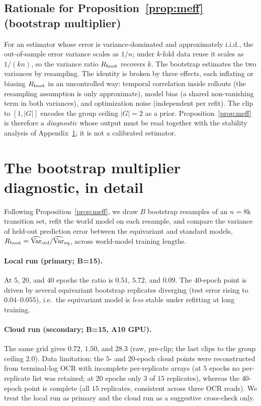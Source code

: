 \documentclass[preprint,12pt]{elsarticle}
\begin{document}
\subsection{Rationale for Proposition~\ref{prop:meff} (bootstrap multiplier)}
For an estimator whose error is variance-dominated and approximately i.i.d.,
the out-of-sample error variance scales as $1/n$; under $k$-fold data reuse
it scales as $1/(kn)$, so the variance ratio $R_{\rm boot}$ recovers $k$. The
bootstrap estimates the two variances by resampling. The identity is broken
by three effects, each inflating or biasing $R_{\rm boot}$ in an uncontrolled
way: temporal correlation inside rollouts (the resampling assumption is only
approximate), model bias (a shared non-vanishing term in both variances), and
optimization noise (independent per refit). The clip to $[1,|G|]$ encodes the
group ceiling $|G|=2$ as a prior. Proposition~\ref{prop:meff} is therefore a
\emph{diagnostic} whose output must be read together with the stability
analysis of Appendix~\ref{app:meff}; it is not a calibrated estimator.

\section{The bootstrap multiplier diagnostic, in detail}\label{app:meff}

Following Proposition~\ref{prop:meff}, we draw $B$ bootstrap resamples of an
$n=8$k transition set, refit the world model on each resample, and compare
the variance of held-out prediction error between the equivariant and
standard models, $R_{\rm boot}=\widehat{\operatorname{Var}}_{\rm std}/
\widehat{\operatorname{Var}}_{\rm eq}$, across world-model training lengths.

\paragraph{Local run (primary; B=15).}
At $5$, $20$, and $40$ epochs the ratio is $0.51$, $5.72$, and $0.09$. The
$40$-epoch point is driven by several equivariant bootstrap replicates
diverging (test error rising to $0.04$--$0.055$), i.e.\ the equivariant model
is \emph{less} stable under refitting at long training.

\paragraph{Cloud run (secondary; B=15, A10 GPU).}
The same grid gives $0.72$, $1.50$, and $28.3$ (raw, pre-clip; the last clips
to the group ceiling $2.0$). Data limitation: the $5$- and $20$-epoch cloud
points were reconstructed from terminal-log OCR with incomplete per-replicate
arrays (at $5$ epochs no per-replicate list was retained; at $20$ epochs only
$3$ of $15$ replicates), whereas the $40$-epoch point is complete (all $15$
replicates, consistent across three OCR reads). We treat the local run as
primary and the cloud run as a suggestive cross-check only.
\end{document}
